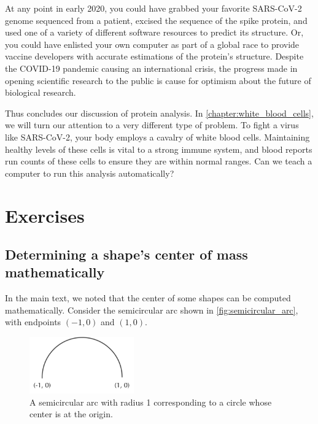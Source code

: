 At any point in early 2020, you could have grabbed your favorite SARS-CoV-2 genome sequenced from a patient, excised the sequence of the spike protein, and used one of a variety of different software resources to predict its structure. Or, you could have enlisted your own computer as part of a global race to provide vaccine developers with accurate estimations of the protein's structure. Despite the COVID-19 pandemic causing an international crisis, the progress made in opening scientific research to the public is cause for optimism about the future of biological research.

Thus concludes our discussion of protein analysis. In \autoref{chapter:white_blood_cells}, we will turn our attention to a very different type of problem. To fight a virus like SARS-CoV-2, your body employs a cavalry of white blood cells. Maintaining healthy levels of these cells is vital to a strong immune system, and blood reports run counts of these cells to ensure they are within normal ranges. Can we teach a computer to run this analysis automatically?

\newpage

\FloatBarrier
\section{Exercises}
\label{sec:coronavirus_exercises}

\subsection{Determining a shape's center of mass mathematically}

In the main text, we noted that the center of some shapes can be computed mathematically. Consider the semicircular arc shown in \autoref{fig:semicircular_arc}, with endpoints $(-1, 0)$ and $(1, 0)$.\\


\begin{figure}[h]
	\centering
	\mySfFamily
	\includegraphics[width = 0.4\textwidth]{../images/semicircular_arc.png}
	\caption{A semicircular arc with radius 1 corresponding to a circle whose center is at the origin.}
	\label{fig:semicircular_arc}
\end{figure}

